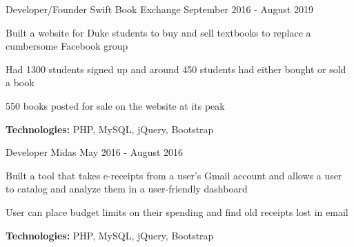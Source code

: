 
\begin{cventries}

  \cventry
    {Developer/Founder} %
    {Swift Book Exchange} %
    {} %
    {September 2016 - August 2019} %
    {
      \begin{cvitems} %
      	\item {Built a website for Duke students to buy and sell textbooks to replace a cumbersome Facebook group}
		\item {Had 1300 students signed up and around 450 students had either bought or sold a book}
		\item {550 books posted for sale on the website at its peak}
		{\setlength \itemindent{-2ex} \itemsep2pt \item[] \textbf{Technologies:} PHP, MySQL, jQuery, Bootstrap}
		{\setlength \itemindent{-2ex} \itemsep2pt \item[]  \href{https://sujaygarlanka.com/projects.html\#swift}{ \faPlayCircle \textbf{\color{awesome}{ Demo}}} \href{https://github.com/sujaygarlanka/swift-book-exchange}{ \faGithub \textbf{\color{awesome}{ Code}}}}
      \end{cvitems}
    }
    
 \cventry
    {Developer} %
    {Midas} %
    {} %
    {May 2016 - August 2016} %
    {
      \begin{cvitems} %
		\item {Built a tool that takes e-receipts from a user’s Gmail account and allows a user to catalog and
analyze them in a user-friendly dashboard}
        \item {User can place budget limits on their spending and find old receipts lost in email}
        {\setlength \itemindent{-2ex} \itemsep2pt \item[] \textbf{Technologies:} PHP, MySQL, jQuery, Bootstrap}
        {\setlength \itemindent{-2ex} \itemsep2pt \item[]  \href{https://sujaygarlanka.com/projects.html\#receipt}{ \faPlayCircle \textbf{\color{awesome}{ Demo}}} \href{https://github.com/sujaygarlanka/receipt-database}{ \faGithub \textbf{\color{awesome}{ Code}}}}
      \end{cvitems}
    }
\end{cventries}